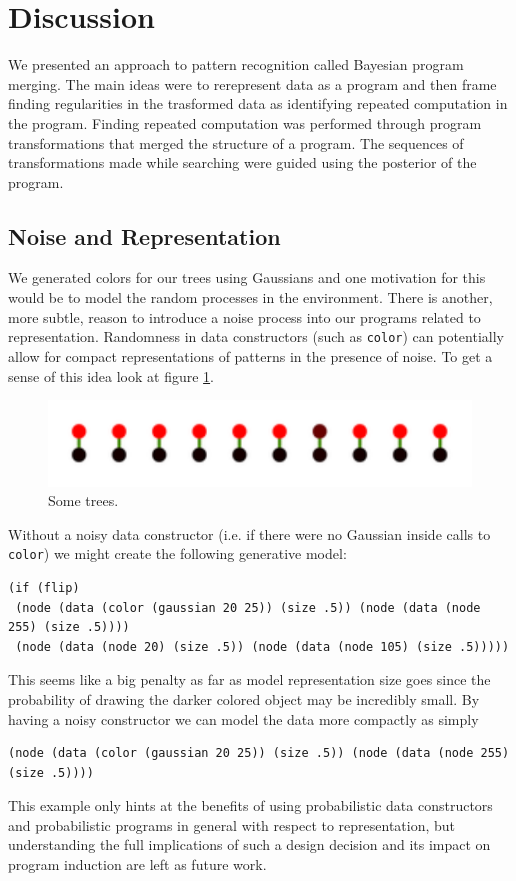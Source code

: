 \documentclass[a4paper,10pt]{article}
\begin{document}
\section{Discussion}
We presented an approach to pattern recognition called Bayesian program merging.  The main ideas were to rerepresent data as a program and then frame finding regularities in the trasformed data as identifying repeated computation in the program.   Finding repeated computation was performed through program transformations that merged the structure of a program.  The sequences of transformations made while searching were guided using the posterior of the program.  

\subsection{Noise and Representation}
We generated colors for our trees using Gaussians and one motivation for this would be to model the random processes in the environment.  There is another, more subtle, reason to introduce a noise process into our programs related to representation.  Randomness in data constructors (such as \texttt{color}) can potentially allow for compact representations of patterns in the presence of noise.  To get a sense of this idea look at figure \ref{fig:noiseCons}. 
\begin{figure}[h]
\begin{center}
\includegraphics[scale=.60]{noisyConstructor.pdf}
\end{center}
\caption{Some trees.}
\label{fig:noiseCons}
\end{figure}
Without a noisy data constructor (i.e. if there were no Gaussian inside calls to \texttt{color}) we might create the following generative model:
\begin{lstlisting}
(if (flip)
 (node (data (color (gaussian 20 25)) (size .5)) (node (data (node 255) (size .5))))
 (node (data (node 20) (size .5)) (node (data (node 105) (size .5)))))
\end{lstlisting}
This seems like a big penalty as far as model representation size goes since the probability of drawing the darker colored object may be incredibly small.  By having a noisy constructor we can model the data more compactly as simply 
\begin{lstlisting}
(node (data (color (gaussian 20 25)) (size .5)) (node (data (node 255) (size .5))))
\end{lstlisting}
This example only hints at the benefits of using probabilistic data constructors and probabilistic programs in general with respect to representation, but understanding the full implications of such a design decision and its impact on program induction are left as future work.
\end{document}
